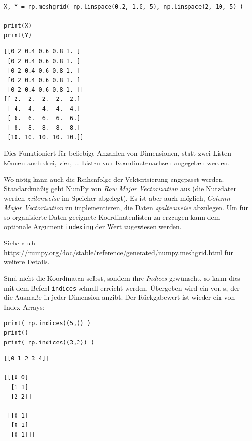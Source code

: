 \begin{codebox}
\begin{verbatim}
X, Y = np.meshgrid( np.linspace(0.2, 1.0, 5), np.linspace(2, 10, 5) )

print(X)
print(Y)
\end{verbatim}
\end{codebox}

\begin{cmdbox}
\begin{verbatim}
[[0.2 0.4 0.6 0.8 1. ]
 [0.2 0.4 0.6 0.8 1. ]
 [0.2 0.4 0.6 0.8 1. ]
 [0.2 0.4 0.6 0.8 1. ]
 [0.2 0.4 0.6 0.8 1. ]]
[[ 2.  2.  2.  2.  2.]
 [ 4.  4.  4.  4.  4.]
 [ 6.  6.  6.  6.  6.]
 [ 8.  8.  8.  8.  8.]
 [10. 10. 10. 10. 10.]]
\end{verbatim}
\end{cmdbox}

Dies Funktioniert für beliebige Anzahlen von Dimensionen, \ie statt zwei Listen können auch drei, vier, ... Listen von Koordinatenachsen angegeben werden.

Wo nötig kann auch die Reihenfolge der Vektorisierung angepasst werden. Standardmäßig geht NumPy von \emph{Row Major Vectorization} aus (\ie die Nutzdaten werden \emph{zeilenweise} im Speicher abgelegt). Es ist aber auch möglich, \emph{Column Major Vectorization} zu implementieren, \ie die Daten \emph{spaltenweise} abzulegen. Um für so organisierte Daten geeignete Koordinatenlisten zu erzeugen kann dem optionale Argument \texttt{indexing} der Wert  zugewiesen werden.

Siehe auch \url{https://numpy.org/doc/stable/reference/generated/numpy.meshgrid.html} für weitere Details.

Sind nicht die Koordinaten selbst, sondern ihre \emph{Indices} gewünscht, so kann dies mit dem Befehl \texttt{indices} schnell erreicht werden. Übergeben wird ein  von s, der die Ausmaße in jeder Dimension angibt. Der Rückgabewert ist wieder ein  von Index-Arrays:

\begin{codebox}
\begin{verbatim}
print( np.indices((5,)) )
print()
print( np.indices((3,2)) )
\end{verbatim}
\end{codebox}

\begin{cmdbox}
\begin{verbatim}
[[0 1 2 3 4]]

[[[0 0]
  [1 1]
  [2 2]]

 [[0 1]
  [0 1]
  [0 1]]]
\end{verbatim}
\end{cmdbox}


